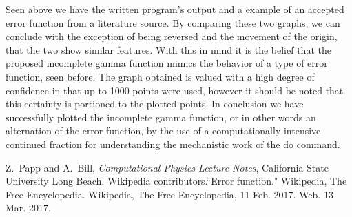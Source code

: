 \documentclass[12pt,letterpaper,notitlepage]{article}
\begin{document}
Seen above we have the written program's output and a example of an accepted error function from a literature source. By comparing these two graphs, we can conclude with the exception of being reversed and the movement of the origin, that the two show similar features. With this in mind it is the belief that the proposed incomplete gamma function mimics the behavior of a type of error function, seen before. The graph obtained is valued with a high degree of confidence in that up to 1000 points were used, however it should be noted that this certainty is portioned to the plotted points. In conclusion we have successfully plotted the incomplete gamma function, or in other words an alternation of the error function, by the use of a computationally intensive continued fraction for understanding the mechanistic work of the do command.     
\newpage
\begin{thebibliography}{}
	Z.~Papp and A.~Bill, {\it Computational Physics Lecture Notes}, California State University Long Beach.
	Wikipedia contributors.``Error function." Wikipedia, The Free Encyclopedia. Wikipedia, The Free Encyclopedia, 11 Feb. 2017. Web. 13 Mar. 2017.
\end{thebibliography}
\end{document}
